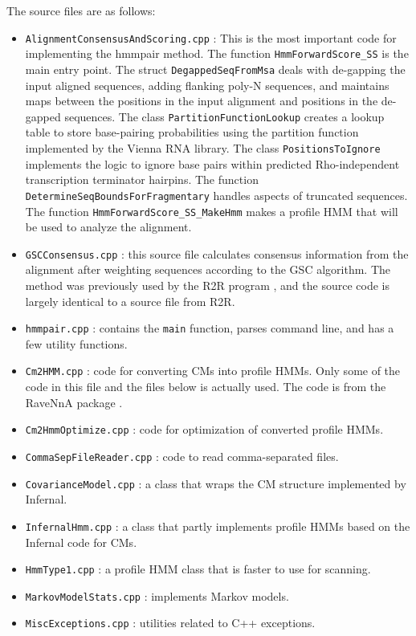 \documentclass[letterpaper,12pt]{report}
\begin{document}
The source files are as follows:
\begin{itemize}
\item {\tt AlignmentConsensusAndScoring.cpp} : This is the most important code for implementing the hmmpair method.  The function {\tt HmmForwardScore\_SS} is the main entry point.  The struct {\tt DegappedSeqFromMsa} deals with de-gapping the input aligned sequences, adding flanking poly-N sequences, and maintains maps between the positions in the input alignment and positions in the de-gapped sequences.  The class {\tt PartitionFunctionLookup} creates a lookup table to store base-pairing probabilities using the partition function implemented by the Vienna RNA library.  The class {\tt PositionsToIgnore} implements the logic to ignore base pairs within predicted Rho-independent transcription terminator hairpins.  The function {\tt DetermineSeqBoundsForFragmentary} handles aspects of truncated sequences.  The function {\tt HmmForwardScore\_SS\_MakeHmm} makes a profile HMM that will be used to analyze the alignment.
\item {\tt GSCConsensus.cpp} : this source file calculates consensus information from the alignment after weighting sequences according to the GSC algorithm.  The method was previously used by the R2R program \cite{RtoR}, and the source code is largely identical to a source file from R2R.
\item {\tt hmmpair.cpp} : contains the {\tt main} function, parses command line, and has a few utility functions.
\item {\tt Cm2HMM.cpp} : code for converting CMs into profile HMMs.  Only some of the code in this file and the files below is actually used.  The code is from the {\sc RaveNnA} package \cite{zashaRECOMB,zashaISMB,zasha06}.
\item {\tt Cm2HmmOptimize.cpp} : code for optimization of converted profile HMMs.
\item {\tt CommaSepFileReader.cpp} : code to read comma-separated files.
\item {\tt CovarianceModel.cpp} : a class that wraps the CM structure implemented by Infernal.
\item {\tt InfernalHmm.cpp} : a class that partly implements profile HMMs based on the Infernal code for CMs.
\item {\tt HmmType1.cpp} : a profile HMM class that is faster to use for scanning.
\item {\tt MarkovModelStats.cpp} : implements Markov models.
\item {\tt MiscExceptions.cpp} : utilities related to C++ exceptions.

\end{itemize}
\end{document}
